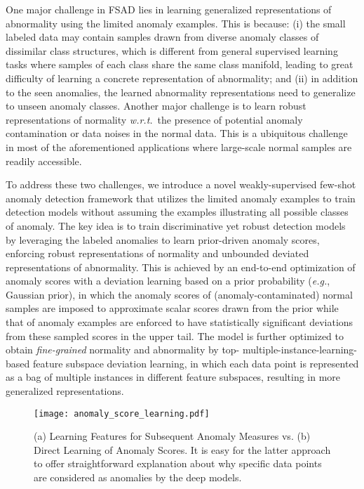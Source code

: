 \documentclass[10pt,journal,compsoc]{IEEEtran}
\newcommand{\eg}{\textit{e.g.}}
\begin{document}
One major challenge in FSAD lies in learning generalized representations of abnormality using the limited anomaly examples. This is because: (i) the small labeled data may contain samples drawn from diverse anomaly classes of dissimilar class structures, which is different from general supervised learning tasks where samples of each class share the same class manifold, leading to great difficulty of learning a concrete representation of abnormality; and (ii) in addition to the seen anomalies, the learned abnormality representations need to generalize to unseen anomaly classes. Another major challenge is to learn robust representations of normality \textit{w.r.t.}\ the presence of potential anomaly contamination or data noises in the normal data. This is a ubiquitous challenge in most of the aforementioned applications where large-scale normal samples are readily accessible.

To address these two challenges, we introduce a novel weakly-supervised few-shot anomaly detection framework that utilizes the limited anomaly examples to train detection models without assuming the examples illustrating all possible classes of anomaly. The key idea is to train discriminative yet robust detection models by leveraging the labeled anomalies to learn prior-driven anomaly scores, enforcing robust representations of normality and unbounded deviated representations of abnormality. This is achieved by an end-to-end optimization of anomaly scores with a deviation learning based on a prior probability (\eg, Gaussian prior), in which the anomaly scores of (anomaly-contaminated) normal samples are imposed to approximate scalar scores drawn from the prior while that of anomaly examples are enforced to have statistically significant deviations from these sampled scores in the upper tail. The model is further optimized to obtain \textit{fine-grained} normality and abnormality by top- multiple-instance-learning-based feature subspace deviation learning, in which each data point is represented as a bag of multiple instances in different feature subspaces, resulting in more generalized representations.

\begin{figure}[t!]
  \centering
    \texttt{[image: anomaly\_score\_learning.pdf]}
  \caption{(a) Learning Features for Subsequent Anomaly Measures
vs. (b) Direct Learning of Anomaly Scores. It is easy for the latter approach to offer straightforward explanation about why specific data points are considered as anomalies by the deep models.}
  \label{fig:anomalyscorelearning}
\end{figure}
\end{document}
